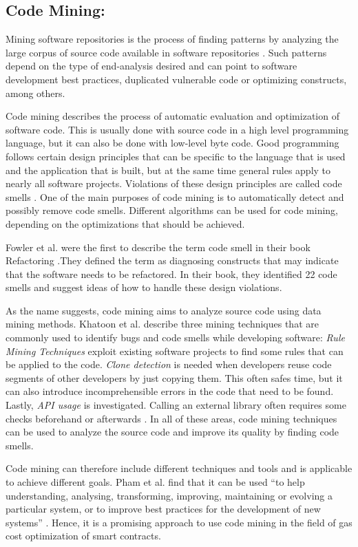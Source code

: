 \documentclass[10pt,conference]{IEEEtran}
\begin{document}
	\subsection{Code Mining:}
	Mining software repositories is the process of finding patterns by analyzing the large corpus of source code available in software repositories \cite{msrllm}. Such patterns depend on the type of end-analysis desired and can point to software development best practices, duplicated vulnerable code or optimizing constructs, among others.
	
	Code mining describes the process of automatic evaluation and optimization of software code. This is usually done with source code in a high level programming language, but it can also be done with low-level byte code. Good programming follows certain design principles that can be specific to the language that is used and the application that is built, but at the same time general rules apply to nearly all software projects. Violations of these design principles are called code smells \cite{codesmellmining}. One of the main purposes of code mining is to automatically detect and possibly remove code smells. Different algorithms can be used for code mining, depending on the optimizations that should be achieved.
	
	Fowler et al. were the first to describe the term code smell in their book Refactoring \cite{refactoring}.They defined the term as diagnosing constructs that may indicate that the software needs to be refactored. In their book, they identified 22 code smells and suggest ideas of how to handle these design violations.
	
	As the name suggests, code mining aims to analyze source code using data mining methods. Khatoon et al. describe three mining techniques that are commonly used to identify bugs and code smells while developing software: \textit{Rule Mining Techniques} exploit existing software projects to find some rules that can be applied to the code. \textit{Clone detection} is needed when developers reuse code segments of other developers by just copying them. This often safes time, but it can also introduce incomprehensible errors in the code that need to be found. Lastly, \textit{API usage} is investigated. Calling an external library often requires some checks beforehand or afterwards \cite{khatoon}. In all of these areas, code mining techniques can be used to analyze the source code and improve its quality by finding code smells.
	
	Code mining can therefore include different techniques and tools and is applicable to achieve different goals. Pham et al. find that it can be used “to help understanding, analysing, transforming, improving, maintaining or evolving a particular system, or to improve best practices for the development of new systems” \cite{treemining}. Hence, it is a promising approach to use code mining in the field of gas cost optimization of smart contracts.
	
\end{document}
